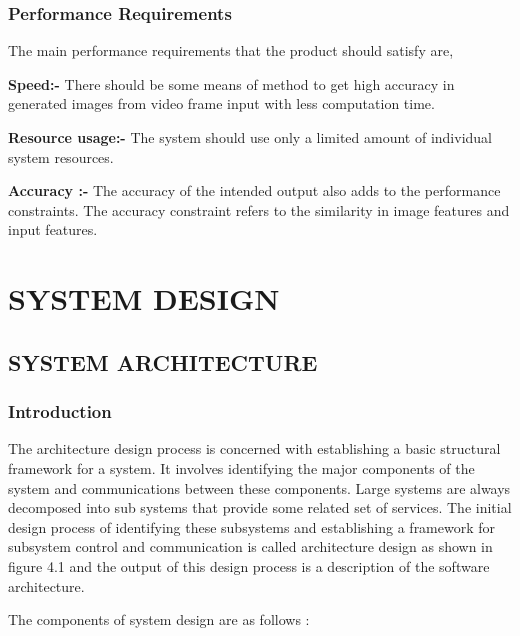 \documentclass[12pt, a4paper]{report}
\begin{document}
{{{\subsection{Performance Requirements}
\item The main performance requirements that the product should satisfy are,
\item \textbf{Speed:-} There should be some means of method to get high accuracy in generated images from
video frame input with less computation time.
\item \textbf{Resource usage:-} The system should use only a limited amount of individual system resources.
\item \textbf{Accuracy :-} The accuracy of the intended output also adds to the performance constraints.
The accuracy constraint refers to the similarity in image features and input features.
}}
\pagebreak


\chapter{SYSTEM DESIGN}\vspace{4pt} 



\section{SYSTEM ARCHITECTURE}
\subsection{Introduction}
\item The architecture design process is concerned with establishing a basic structural framework
for a system. It involves identifying the major components of the system and communications
between these components. Large systems are always decomposed into sub systems that provide some related set of services. The initial design process of identifying these subsystems
and establishing a framework for subsystem control and communication is called architecture
design as shown in figure 4.1 and the output of this design process is a description of the software architecture.
\item The components of system design are as follows :
}
\end{document}

